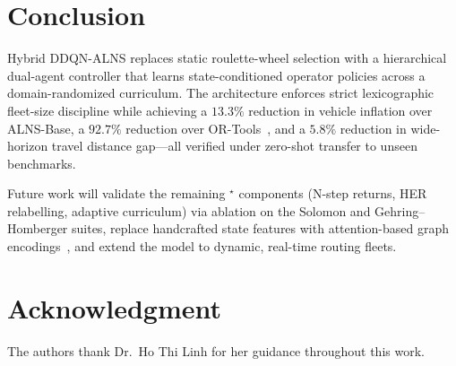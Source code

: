 \documentclass[conference]{IEEEtran}
\begin{document}
\section{Conclusion}
\label{sec:conclusion}

Hybrid DDQN-ALNS replaces static roulette-wheel selection with a hierarchical
dual-agent controller that learns state-conditioned operator policies across a
domain-randomized curriculum.  The architecture enforces strict lexicographic
fleet-size discipline while achieving a $13.3\%$ reduction in vehicle inflation
over ALNS-Base, a $92.7\%$ reduction over OR-Tools~\cite{ortools}, and a $5.8\%$
reduction in wide-horizon travel distance gap---all verified under zero-shot
transfer to unseen benchmarks.

Future work will validate the remaining ${}^\star$ components (N-step
returns, HER relabelling, adaptive curriculum) via ablation on the Solomon and
Gehring--Homberger suites, replace handcrafted state features with
attention-based graph encodings~\cite{kool2019attention,vinyals2015pointer},
and extend the model to dynamic, real-time routing fleets.


\section*{Acknowledgment}
The authors thank Dr.~Ho Thi Linh for her guidance throughout this work.

\balance
\end{document}
